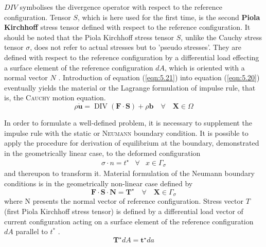 $DIV$ symbolises the divergence operator with respect to the reference configuration. Tensor
$S$, which is here used for the first time, is the second \textbf{{Piola Kirchhoff}} stress tensor defined with respect to the reference configuration. It should be noted that the Piola Kirchhoff stress
tensor $S$, unlike the Cauchy stress tensor $\sigma$, does not refer to actual stresses but to ’pseudo
stresses’. They are defined with respect to the reference configuration by a differential load
effecting a surface element of the reference configuration $dA$, which is oriented with a normal
vector $N$ . Introduction of equation (\ref{eqn:5.21}) into equation (\ref{eqn:5.20}) eventually yields the material or the Lagrange formulation of impulse rule, that is, the \textsc{Cauchy} motion equation.
\begin{equation}
 \rho \ddot{\boldsymbol{u}}=\operatorname{DIV}(\boldsymbol{F} \cdot \boldsymbol{S})+\rho \boldsymbol{b} \quad \forall \quad \boldsymbol{X} \in \Omega 
 \label{eqn:5.22} 
\end{equation}

In order to formulate a well-defined problem, it is necessary to supplement the impulse rule
with the static or \textsc{Neumann} boundary condition.  It is possible to apply the procedure for derivation of equilibrium
at the boundary, demonstrated in the geometrically linear case, to the deformed configuration
\begin{equation}
 \begin{array}{ccc}\sigma \cdot n=t^{\star} & \forall & x \in \Gamma_{\sigma}\end{array} 
 \label{eqn:5.23} 
\end{equation}
and thereupon to transform it. Material formulation of the Neumann boundary conditions is
in the geometrically non-linear case defined by
\begin{equation}
 \boldsymbol{F} \cdot \boldsymbol{S} \cdot \boldsymbol{N}=\boldsymbol{T}^{\star} \quad \forall \quad \boldsymbol{X} \in \Gamma_{\sigma} 
 \label{eqn:5.24} 
\end{equation}
where N presents the normal vector of reference
configuration. Stress vector $T$ (first Piola Kirchhoff stress tensor) is defined by a differential
load vector of current configuration acting on a surface element of the reference configuration
$dA$ parallel to $t^*$  .
\begin{equation}
 \boldsymbol{T}^{\star} d A=\boldsymbol{t}^{\star} d a 
 \label{eqn:5.23} 
\end{equation}

